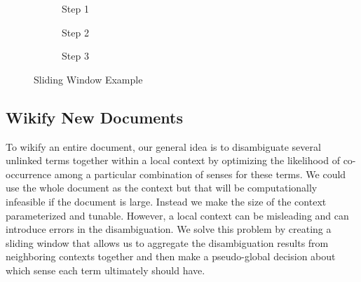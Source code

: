 \begin{figure}[!ht]
\centering
\begin{subfigure}[h]{0.8\columnwidth}
\centering
{}
\caption{Step 1}
\label{fig:sw1}
\end{subfigure}
\myskip
\begin{subfigure}[h]{0.8\columnwidth}
\centering
{}
\caption{Step 2}
\label{fig:sw2}
\end{subfigure}
\myskip
\begin{subfigure}[h]{0.8\columnwidth}
\centering
{}
\caption{Step 3}
\label{fig:sw3}
\end{subfigure}
\caption{Sliding Window Example}
\label{fig:sw}
\end{figure}

\subsection{Wikify New Documents}
\label{sec:wikify}


To wikify an entire document, our general idea is to
disambiguate several unlinked terms together within
a local context by optimizing the likelihood of co-occurrence among
a particular combination of senses for these terms. We could use
the whole document as the context but that will be computationally infeasible if
the document is large.
Instead we make the size of the context parameterized and tunable.
However, a local context can be misleading and can introduce errors in the
disambiguation. We solve this problem by creating a sliding window
that allows us to aggregate the disambiguation results from neighboring contexts
together and then make a pseudo-global decision about which sense each term
ultimately should have.


